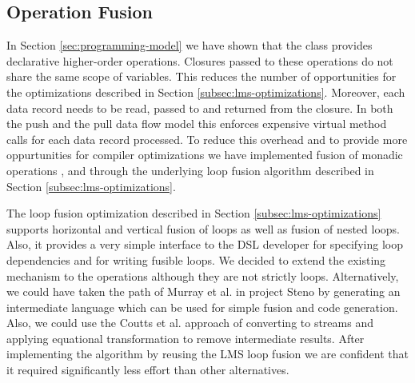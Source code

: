\subsection{Operation Fusion}
\label{sec:fusion}

In Section \ref{sec:programming-model} we have shown that the  class
provides declarative higher-order operations. Closures passed to these
operations do not share the same scope of variables. This reduces the number of
opportunities for the optimizations described in Section
\ref{subsec:lms-optimizations}. Moreover, each data record needs to be read,
passed to and returned from the closure. In both the push and the pull data flow
model this enforces expensive virtual method calls \cite{murray_steno:_2011} for
each data record processed. To reduce this overhead and to provide more
oppurtunities for compiler optimizations we have implemented fusion of monadic
operations ,  and  through the underlying
loop fusion algorithm described in Section \ref{subsec:lms-optimizations}.

The loop fusion optimization described in Section \ref{subsec:lms-optimizations}
supports horizontal and vertical fusion of loops as well as fusion of nested
loops. Also, it provides a very simple interface to the DSL developer for
specifying loop dependencies and for writing fusible loops. We decided to extend
the existing mechanism to the  operations although they are not
strictly loops. Alternatively, we could have taken the path of Murray et al. in
project Steno \cite{murray_steno:_2011} by generating an intermediate language which can be
used for simple fusion and code generation. Also, we could use the Coutts et al.
\cite{coutts_stream_2007} approach of converting  to streams and
applying equational transformation to remove intermediate results. After
implementing the algorithm by reusing the LMS loop fusion we are confident that
it required significantly less effort than other alternatives.

